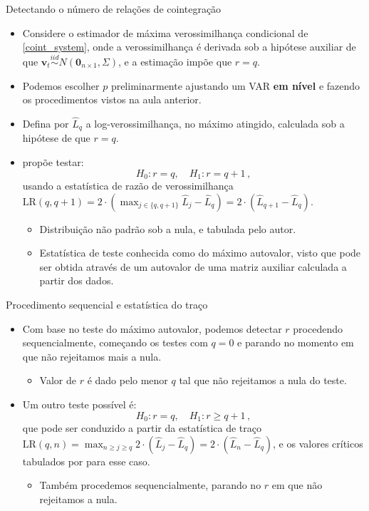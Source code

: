 \documentclass[11pt]{beamer}
\newenvironment{halfwideitemize}{\itemize\addtolength{\itemsep}{0.5em}}{\enditemize}
\begin{document}
\begin{frame}{Detectando o número de relações de cointegração}
	\begin{itemize}
		\item Considere o estimador de máxima verossimilhança condicional de \eqref{coint_system}, onde a verossimilhança é derivada sob a hipótese auxiliar de que $\boldsymbol{v}_t \overset{iid}{\sim} N(\boldsymbol{0}_{n\times 1}, \Sigma)$, e a estimação impõe que $r=q$.
		\begin{halfwideitemize}
			\item Podemos escolher $p$ preliminarmente ajustando um VAR \textbf{em nível} e fazendo os procedimentos vistos na aula anterior.
		\end{halfwideitemize}
								\item Defina por  $\hat{L}_q$ a log-verossimilhança, no máximo atingido, calculada sob a hipótese de que $r=q$.
		\item \citet{Johansen1991} propõe testar:
		$$H_0 : r= q, \quad H_1: r= q+1\, ,$$
		usando a estatística de razão de verossimilhança $\text{LR}(q,q+1) = 2 \cdot (\max_{j \in \{q,q+1\}} \hat L_{j} - \hat L_q)  = 2 \cdot ( \hat L_{q+1} - \hat L_q)$.
		\begin{itemize}
			\item Distribuição não padrão sob a nula, e tabulada pelo autor.
			\item Estatística de teste conhecida como do {\color{blue}máximo autovalor}, visto que pode ser obtida através de um autovalor de uma matriz auxiliar calculada a partir dos dados.
		\end{itemize}
				
	\end{itemize}
\end{frame}
\begin{frame}{Procedimento sequencial e estatística do traço}
	\begin{itemize}
				\item Com base no teste do máximo autovalor, podemos detectar $r$ procedendo sequencialmente, começando os testes com $q=0$ e parando no momento em que não rejeitamos mais a nula.
				\begin{itemize}
					\item Valor de $r$ é dado pelo menor $q$ tal que não rejeitamos a nula do teste.
				\end{itemize} 
	 		\item Um outro teste possível é:
		$$H_0 : r= q, \quad H_1: r\geq q+1 \, ,$$
		que pode ser conduzido a partir da {\color{blue}estatística de traço} $\text{LR}(q,n) = \max_{n\geq j\geq q}2 \cdot ( \hat L_{j} - \hat L_q)= 2 \cdot ( \hat L_{n} - \hat L_q)$, e os valores críticos tabulados por \citet{Johansen1991} para esse caso.
		\begin{itemize}
			\item Também procedemos sequencialmente, parando no $r$ em que não rejeitamos a nula. 
		\end{itemize}
	\end{itemize}
\end{frame}
\end{document}
